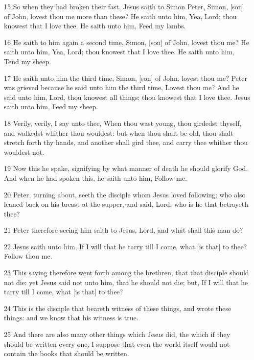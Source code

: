 \par 15 So when they had broken their fast, Jesus saith to Simon Peter, Simon, [son] of John, lovest thou me more than these? He saith unto him, Yea, Lord; thou knowest that I love thee. He saith unto him, Feed my lambs.
\par 16 He saith to him again a second time, Simon, [son] of John, lovest thou me? He saith unto him, Yea, Lord; thou knowest that I love thee. He saith unto him, Tend my sheep.
\par 17 He saith unto him the third time, Simon, [son] of John, lovest thou me? Peter was grieved because he said unto him the third time, Lovest thou me? And he said unto him, Lord, thou knowest all things; thou knowest that I love thee. Jesus saith unto him, Feed my sheep.
\par 18 Verily, verily, I say unto thee, When thou wast young, thou girdedst thyself, and walkedst whither thou wouldest: but when thou shalt be old, thou shalt stretch forth thy hands, and another shall gird thee, and carry thee whither thou wouldest not.
\par 19 Now this he spake, signifying by what manner of death he should glorify God. And when he had spoken this, he saith unto him, Follow me.
\par 20 Peter, turning about, seeth the disciple whom Jesus loved following; who also leaned back on his breast at the supper, and said, Lord, who is he that betrayeth thee?
\par 21 Peter therefore seeing him saith to Jesus, Lord, and what shall this man do?
\par 22 Jesus saith unto him, If I will that he tarry till I come, what [is that] to thee? Follow thou me.
\par 23 This saying therefore went forth among the brethren, that that disciple should not die: yet Jesus said not unto him, that he should not die; but, If I will that he tarry till I come, what [is that] to thee?
\par 24 This is the disciple that beareth witness of these things, and wrote these things: and we know that his witness is true.
\par 25 And there are also many other things which Jesus did, the which if they should be written every one, I suppose that even the world itself would not contain the books that should be written.

